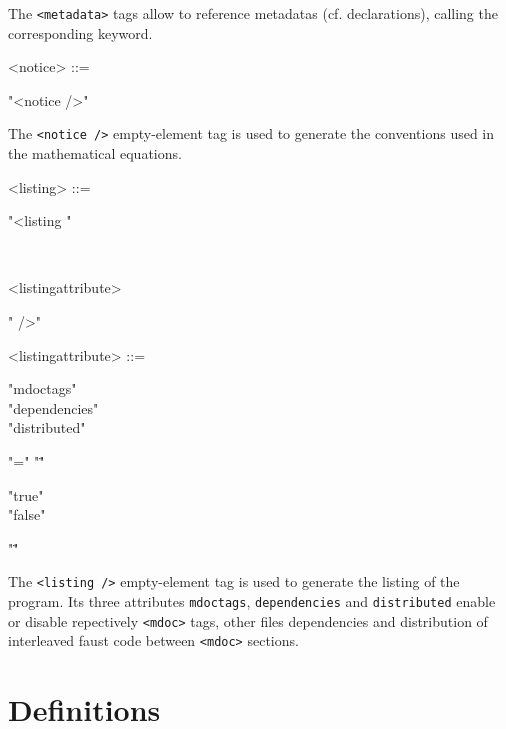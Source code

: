 \documentclass[a4paper,10pt]{book}
\begin{document}
The \lstinline'<metadata>' tags allow to reference \faust metadatas (cf. declarations), calling the corresponding keyword.

\begin{grammar}
  <notice> ::= 
  \begin{syntdiag}
    "<notice />"
  \end{syntdiag}
\end{grammar}

The \lstinline'<notice />' empty-element tag is used to generate the conventions used in the mathematical equations.

\begin{grammar}
  <listing> ::= 
  \begin{syntdiag}
    "<listing " 
    \begin{stack}
      \\
      \begin{rep}
        <listingattribute>
      \end{rep}
    \end{stack}
    " />"
  \end{syntdiag}
\end{grammar}


\begin{grammar}
  <listingattribute> ::= 
  \begin{syntdiag}
    \begin{stack}
      "mdoctags" \\
      "dependencies" \\
      "distributed"
    \end{stack}
    "=" "\""
    \begin{stack}
      "true" \\ "false"
    \end{stack}
    "\""
  \end{syntdiag}
\end{grammar}


The \lstinline'<listing />' empty-element tag is used to generate the listing of the \faust program. Its three attributes \lstinline'mdoctags', \lstinline'dependencies' and \lstinline'distributed' enable or disable repectively \lstinline'<mdoc>' tags, other files dependencies and distribution of interleaved faust code between \lstinline'<mdoc>' sections.


\section{Definitions}
\end{document}
